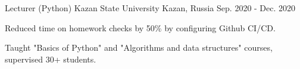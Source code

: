 \begin{cventries}
  \cventry
    {Lecturer (Python)} %
    {Kazan State University} %
    {Kazan, Russia} %
    {Sep. 2020 - Dec. 2020} %
    {
      \begin{cvitems} %
        \item {Reduced time on homework checks by 50\% by configuring Github CI/CD.}
        \item {Taught "Basics of Python" and "Algorithms and data structures" courses, supervised 30+ students.}
      \end{cvitems}
    }

\end{cventries}
